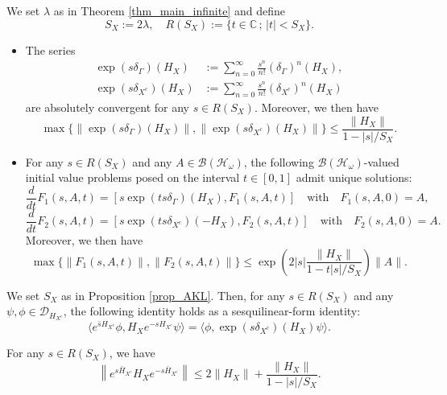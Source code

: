 \documentclass[10pt,a4paper]{amsart}
\begin{document}
\begin{lemma}\label{lem_derivation}
We set $\lambda$ as in Theorem \ref{thm_main_infinite} and define
\[
S_X:=2\lambda,\quad R(S_X):=\{t\in\mathbb{C}\,;\,|t|<S_X\}.
\]
\begin{itemize}
\item[(i)] The series
\begin{align*}
\exp(s\delta_\Gamma)(H_X)
&:=\sum_{n=0}^\infty\frac{s^n}{n!} (\delta_\Gamma)^n(H_X),\\
\exp(s\delta_{X^c})(H_X)
&:=\sum_{n=0}^\infty\frac{s^n}{n!} (\delta_{X^c})^n(H_X)
\end{align*}
are absolutely convergent for any $s\in R(S_X)$. Moreover, we then have
\[
\max\{\|\exp(s\delta_\Gamma)(H_X)\|, \|\exp(s\delta_{X^c})(H_X)\|\}
\leq \frac{\|H_X\|}{1-|s|/S_X}.
\]

\item[(ii)] For any $s\in R(S_X)$ and any $A\in\mathcal{B}(\mathcal{H}_\omega)$, the following
$\mathcal{B}(\mathcal{H}_\omega)$-valued initial value problems posed on the interval $t\in[0,1]$ admit unique solutions:
\[
\frac{d}{dt} F_1(s,A,t)=[s\exp(ts\delta_\Gamma)(H_X),F_1(s,A,t)]
\quad\text{with}\quad F_1(s,A,0)=A,
\]
\[
\frac{d}{dt} F_2(s,A,t)=[s\exp(ts\delta_{X^c})(-H_X),F_2(s,A,t)]
\quad\text{with}\quad F_2(s,A,0)=A.
\]
Moreover, we then have
\[
\max\{\|F_1(s,A,t)\|,\|F_2(s,A,t)\|\}
\leq \exp\left(2|s|\frac{\|H_X\|}{1-t|s|/S_X}\right) \|A\|.
\]
\end{itemize}
\end{lemma}

\begin{lemma}\label{lem_infinite2}
We set $S_X$ as in Proposition \ref{prop_AKL}. Then, for any $s\in R(S_X)$ and any $\psi,\phi\in\mathcal{D}_{H_{X^c}}$, the following identity holds as a sesquilinear-form identity:
\[
\langle e^{\bar{s}H_{X^c}}\phi,H_X e^{-sH_{X^c}}\psi\rangle=\langle\phi,\exp(s\delta_{X^c})(H_X)\psi\rangle.
\]
\end{lemma}

\begin{lemma}\label{lem_G1}
For any $s\in R(S_X)$, we have
\[
\left\|
e^{s\bar{H}_{X^c}}H_X e^{-s\bar{H}_{X^c}}
\right\|
\leq 2\|H_X\| +\frac{\|H_X\|}{1-|s|/S_X}.
\]
\end{lemma}
\end{document}
